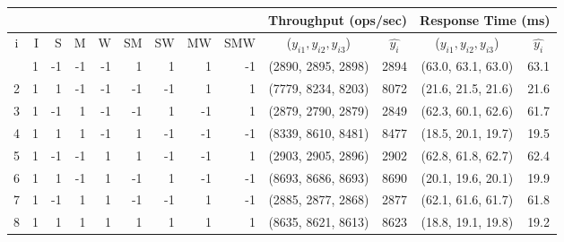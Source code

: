 \begin{tabular}{|c|rrrrrrrr|c|c|c|c|}
       \cline{10-13}
       \multicolumn{9}{c}{} & \multicolumn{2}{|c}{\textbf{Throughput} (ops/sec)} & \multicolumn{2}{|c|}{\textbf{Response Time} (ms)}\TBstrut\\
       \hline
       i & \hphantom{-}I\hphantom{-} & \hphantom{-}S\hphantom{-} & \hphantom{-}M\hphantom{-} &\hphantom{-}W\hphantom{-} & SM & SW & MW & SMW & ($y_{i1}, y_{i2}, y_{i3}$) & $\hat{y_i}$  & ($y_{i1}, y_{i2}, y_{i3}$) & $\hat{y_i}$\TBstrut\\
       \hline
   \Tstrut 1 & 1\hphantom{-} & -1\hphantom{-} & -1\hphantom{-} & -1\hphantom{--} & 1\hphantom{--} & 1\hphantom{--} & 1\hphantom{--} & -1\hphantom{---} & (2890, 2895, 2898) & 2894 & (63.0, 63.1, 63.0) & 63.1 \\
   2 & 1\hphantom{-} & 1\hphantom{-} & -1\hphantom{-} & -1\hphantom{--} & -1\hphantom{--} & -1\hphantom{--} & 1\hphantom{--} & 1\hphantom{---} & (7779, 8234, 8203) & 8072 & (21.6, 21.5, 21.6) & 21.6 \\
   3 & 1\hphantom{-} & -1\hphantom{-} & 1\hphantom{-} & -1\hphantom{--} & -1\hphantom{--} & 1\hphantom{--} & -1\hphantom{--} & 1\hphantom{---} & (2879, 2790, 2879) & 2849 & (62.3, 60.1, 62.6) & 61.7 \\
   4 & 1\hphantom{-} & 1\hphantom{-} & 1\hphantom{-} & -1\hphantom{--} & 1\hphantom{--} & -1\hphantom{--} & -1\hphantom{--} & -1\hphantom{---} & (8339, 8610, 8481) & 8477 & (18.5, 20.1, 19.7) & 19.5 \\
   5 & 1\hphantom{-} & -1\hphantom{-} & -1\hphantom{-} & 1\hphantom{--} & 1\hphantom{--} & -1\hphantom{--} & -1\hphantom{--} & 1\hphantom{---} & (2903, 2905, 2896) & 2902 & (62.8, 61.8, 62.7) & 62.4 \\
   6 & 1\hphantom{-} & 1\hphantom{-} & -1\hphantom{-} & 1\hphantom{--} & -1\hphantom{--} & 1\hphantom{--} & -1\hphantom{--} & -1\hphantom{---} & (8693, 8686, 8693) & 8690 & (20.1, 19.6, 20.1) & 19.9 \\
   7 & 1\hphantom{-} & -1\hphantom{-} & 1\hphantom{-} & 1\hphantom{--} & -1\hphantom{--} & -1\hphantom{--} & 1\hphantom{--} & -1\hphantom{---} & (2885, 2877, 2868) & 2877 & (62.1, 61.6, 61.7) & 61.8 \\
   8 & 1\hphantom{-} & 1\hphantom{-} & 1\hphantom{-} & 1\hphantom{--} & 1\hphantom{--} & 1\hphantom{--} & 1\hphantom{--} & 1\hphantom{---} & (8635, 8621, 8613) & 8623 & (18.8, 19.1, 19.8) & 19.2 \\
   \hline
    \end{tabular}